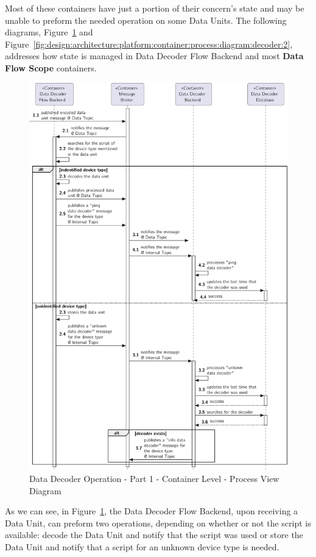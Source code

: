 Most of these containers have just a portion of their concern's state and may be unable to preform the needed operation on some Data Units. The following diagrams, Figure~\ref{fig:design:architecture:platform:container:process:diagram:decoder:1} and Figure~\ref{fig:design:architecture:platform:container:process:diagram:decoder:2}, addresses how state is managed in Data Decoder Flow Backend and most \textbf{Data Flow Scope} containers.

\begin{figure}
   \centering
   \includegraphics[page=1,width=0.8\columnwidth]{assets/diagrams/design/architectural/level2/process/data-decoder-flow-1.pdf}
   \caption[Data Decoder Operation - Part 1 - Container Level - Process View Diagram]{Data Decoder Operation - Part 1 - Container Level - Process View Diagram}
   \label{fig:design:architecture:platform:container:process:diagram:decoder:1}
\end{figure}

As we can see, in Figure~\ref{fig:design:architecture:platform:container:process:diagram:decoder:1}, the Data Decoder Flow Backend, upon receiving a Data Unit, can preform two operations, depending on whether or not the script is available: decode the Data Unit and notify that the script was used or store the Data Unit and notify that a script for an unknown device type is needed.

